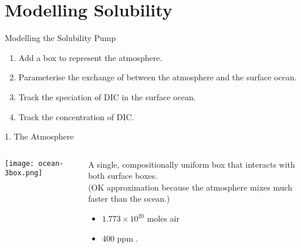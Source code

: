 \section{Modelling Solubility}

\begin{frame}{Modelling the Solubility Pump}

\begin{enumerate}
    \item Add a box to represent the atmosphere.
    \item Parameterise the exchange of  between the atmosphere and the surface ocean.
    \item Track the speciation of DIC in the surface ocean.
    \item Track the concentration of DIC.
\end{enumerate}

\end{frame}


\begin{frame}{1. The Atmosphere}

    \begin{columns}
        \begin{column}{0.6\linewidth}
            \texttt{[image: ocean-3box.png]}
        \end{column}   
        \begin{column}{0.35\linewidth}
            A single, compositionally uniform box that interacts with both surface boxes. \\
            \tiny (OK approximation because the atmosphere mixes much faster than the ocean.) 
            
            \normalsize\bigskip
            \begin{itemize}
                \item $1.773 \times 10^{20}$ moles air
                \item 400 ppm .
            \end{itemize}
        \end{column} 
    \end{columns}
    
\end{frame}

